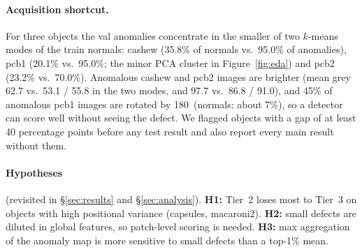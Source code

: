 \paragraph{Acquisition shortcut.}
For three objects the val anomalies concentrate in the smaller of two $k$-means modes of the train
normals: cashew (35.8\% of normals vs.\ 95.0\% of anomalies), pcb1 (20.1\% vs.\ 95.0\%; the minor PCA
cluster in Figure~\ref{fig:eda}) and pcb2 (23.2\% vs.\ 70.0\%).
Anomalous cashew and pcb2 images are brighter (mean grey 62.7 vs.\ 53.1 / 55.8 in the two modes, and
97.7 vs.\ 86.8 / 91.0), and 45\% of anomalous pcb1 images are rotated by 180\textdegree\ (normals:
about 7\%), so a detector can score well without seeing the defect.
We flagged objects with a gap of at least 40 percentage points before any test result and also report
every main result without them.

\paragraph{Hypotheses} (revisited in \S\ref{sec:results} and \S\ref{sec:analysis}).
\textbf{H1:} Tier~2 loses most to Tier~3 on objects with high positional variance (capsules,
macaroni2).
\textbf{H2:} small defects are diluted in global features, so patch-level scoring is needed.
\textbf{H3:} max aggregation of the anomaly map is more sensitive to small defects than a top-1\% mean.
